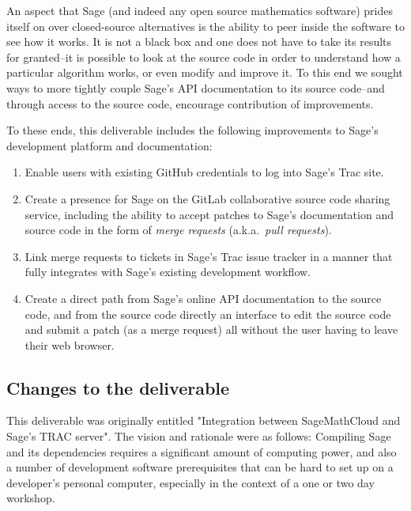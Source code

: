 An aspect that Sage (and indeed any open source mathematics software) prides
itself on over closed-source alternatives is the ability to peer inside the
software to see how it works.  It is not a black box and one does not have to
take its results for granted--it is possible to look at the source code in
order to understand how a particular algorithm works, or even modify and
improve it.  To this end we sought ways to more tightly couple Sage's API
documentation to its source code--and through access to the source code,
encourage contribution of improvements.

To these ends, this deliverable includes the following improvements to Sage's
development platform and documentation:
\begin{enumerate}
\item Enable users with existing GitHub credentials to log into Sage's
    Trac site.
\item Create a presence for Sage on the GitLab collaborative source code
    sharing service, including the ability to accept patches to Sage's
    documentation and source code in the form of {\em merge requests}
    (a.k.a.~{\em pull requests}).
\item Link \GitLab merge requests to tickets in Sage's Trac issue tracker in
    a manner that fully integrates with Sage's existing development workflow.
\item Create a direct path from Sage's online API documentation to the source
    code, and from the source code directly an interface to edit the source
    code and submit a patch (as a merge request) all without the user having to
    leave their web browser.
\end{enumerate}



\hypertarget{changes-to-deliverable}{%
\subsection{Changes to the deliverable\label{changes-to-deliverable}}}


This deliverable was originally entitled "Integration between SageMathCloud and
Sage's TRAC server". The vision and rationale were as follows: Compiling Sage
and its dependencies requires a significant amount of computing power, and also
a number of development software prerequisites that can be hard to set up on a
developer's personal computer, especially in the context of a one or two day
workshop.

